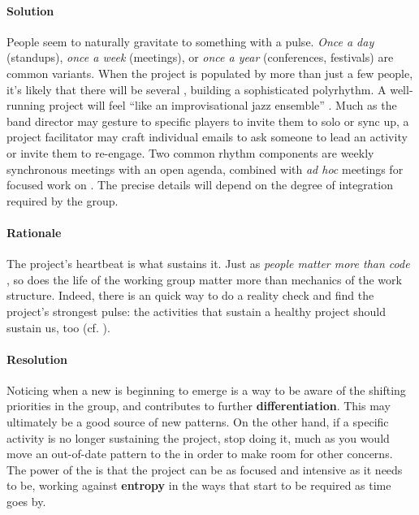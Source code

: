 \begin{refsection}
\paragraph{Solution} People seem to naturally gravitate to something with a pulse.  \emph{Once a day} (standups), \emph{once a week} (meetings), or \emph{once a year} (conferences, festivals) are common variants.  When the project is populated by more than just a few people, it's likely that there will be several , building a sophisticated polyrhythm.  A well-running project will feel ``like an improvisational jazz ensemble'' \cite{david2001software}.  Much as the band director may gesture to specific players to invite them to solo or sync up, a project facilitator may craft individual emails to ask someone to lead an activity or invite them to re-engage.  Two common rhythm components are weekly synchronous meetings with an open agenda, combined with \emph{ad hoc} meetings for focused work on .  The precise details will depend on the degree of integration required by the group.

\paragraph{Rationale}  The project's heartbeat is what sustains it. Just as \emph{people matter more than code} \cite{torvalds-interview}, so does the life of the working group matter more than mechanics of the work structure.  Indeed, there is an quick way to do a reality check and find the project's strongest pulse: the activities that sustain a healthy project should sustain us, too (cf. ).

\paragraph{Resolution} Noticing when a new  is beginning to emerge is a way to be aware of the shifting priorities in the group, and contributes to further \textbf{differentiation}.  This may ultimately be a good source of new patterns. On the other hand, if a specific activity is no longer sustaining the project, stop doing it, much as you would move an out-of-date pattern to the  in order to make room for other concerns. The power of the  is that the project can be as focused and intensive as it needs to be, working against \textbf{entropy} in the ways that start to be required as time goes by.


\end{refsection}
